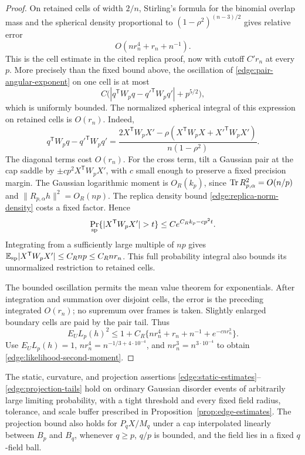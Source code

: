 \begin{proof}
On retained cells of width \(2/n\), Stirling's formula for the binomial
overlap mass and the spherical density proportional to
\((1-\rho^2)^{(n-3)/2}\) gives relative error
\begin{equation}\label{edge:retained-stirling}
 O(nr_n^4+r_n+n^{-1}).
\end{equation}
This is the cell estimate in the cited replica proof, now with cutoff
\(C'r_n\) at every \(p\).  More precisely than the fixed bound above,
the oscillation of \eqref{edge:pair-angular-exponent} on one cell is at most
\[
 C\bigl(|q^{\mathsf T}W_pq-{q'}^{\mathsf T}W_pq'|+p^{5/2}\bigr),
\]
which is uniformly bounded.  The normalized spherical integral of
this expression on retained cells is \(O(r_n)\).  Indeed,
\[
 q^{\mathsf T}W_pq-{q'}^{\mathsf T}W_pq'
 =\frac{2X^{\mathsf T}W_pX'
       -\rho(X^{\mathsf T}W_pX+{X'}^{\mathsf T}W_pX')}
        {n(1-\rho^2)}.
\]
The diagonal terms cost \(O(r_n)\).  For the cross term, tilt a Gaussian
pair at the cap saddle by \(\pm cp^2X^{\mathsf T}W_pX'\), with \(c\)
small enough to preserve a fixed precision margin.  The Gaussian
logarithmic moment is \(O_R(k_p)\), since
\(\operatorname{Tr} R_{p,\alpha}^2=O(n/p)\) and
\(\|R_{p,\alpha}h\|^2=O_R(np)\).  The replica density bound
\eqref{edge:replica-norm-density} costs a fixed factor.  Hence
\[
 \Pr_{\rm sp}\{|X^{\mathsf T}W_pX'|>t\}
       \le C e^{C_Rk_p-cp^2t}.
\]
Integrating from a sufficiently large multiple of \(np\) gives
\(\mathbb E_{\rm sp}|X^{\mathsf T}W_pX'|\le C_Rnp\le C_Rnr_n\).
This full probability integral also bounds its unnormalized restriction
to retained cells.

The bounded oscillation permits the mean value theorem for exponentials.
After integration and summation over disjoint cells, the error is the
preceding integrated \(O(r_n)\); no supremum over frames is taken.
Slightly enlarged boundary cells are paid by the pair tail.  Thus
\[
 E_UL_p(h)^2
 \le1+C_R\{nr_n^4+r_n+n^{-1}+e^{-cnr_n^3}\}.
\]
Use \(E_UL_p(h)=1\),
\(nr_n^4=n^{-1/3+4\cdot10^{-4}}\), and
\(nr_n^3=n^{3\cdot10^{-4}}\) to obtain
\eqref{edge:likelihood-second-moment}.
\end{proof}

\begin{lemma}\label{edge:cube-caps}
The static, curvature, and projection assertions
\eqref{edge:static-estimates}--\eqref{edge:projection-tails} hold on
ordinary Gaussian disorder events of arbitrarily large limiting
probability, with a tight threshold and every fixed field radius,
tolerance, and scale buffer prescribed in
Proposition~\ref{prop:edge-estimates}.  The projection bound also holds
for \(P_qX/M_q\) under a cap interpolated linearly between \(B_p\) and
\(B_q\), whenever \(q\ge p\), \(q/p\) is bounded, and the field lies
in a fixed \(q\)-field ball.
\end{lemma}

